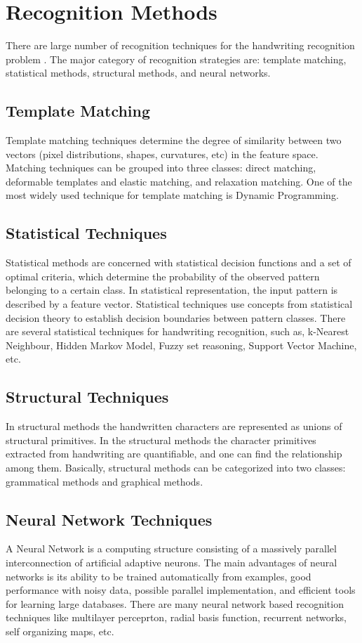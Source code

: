 \section{Recognition Methods}\label{section_recognition_strategies}
There are large number of recognition techniques for the handwriting recognition problem \cite{Jain2000}. The major category of recognition strategies are: template matching, statistical methods, structural methods, and neural networks.

\subsection{Template Matching}\label{section_template_matching}
Template matching techniques determine the degree of similarity between two vectors (pixel distributions, shapes, curvatures, etc) in the feature space. Matching techniques can be grouped into three classes: direct matching, deformable templates and elastic matching, and relaxation matching. One of the most widely used technique for template matching is Dynamic Programming.

\subsection{Statistical Techniques}\label{section_statistical_methods}
Statistical methods are concerned with statistical decision functions and a set of optimal criteria, which determine the probability of the observed pattern belonging to a certain class. In statistical representation, the input pattern is described by a feature vector. Statistical techniques use concepts from statistical decision theory to establish decision boundaries between pattern classes. There are several statistical techniques for handwriting recognition, such as, k-Nearest Neighbour, Hidden Markov Model, Fuzzy set reasoning, Support Vector Machine, etc.

\subsection{Structural Techniques}\label{section_structural_methods}
In structural methods the handwritten characters are represented as unions of structural primitives. In the structural methods the character primitives extracted from handwriting are quantifiable, and one can find the relationship among them. Basically, structural methods can be categorized into two classes: grammatical methods and graphical methods.

\subsection{Neural Network Techniques}\label{section_neural_network_methods}
A Neural Network is a computing structure consisting of a massively parallel interconnection  of artificial adaptive neurons. The main advantages of neural networks is its ability to be trained automatically from examples, good performance with noisy data, possible parallel implementation, and efficient tools for learning large databases. There are many neural network based recognition techniques like multilayer perceprton, radial basis function, recurrent networks, self organizing maps, etc.